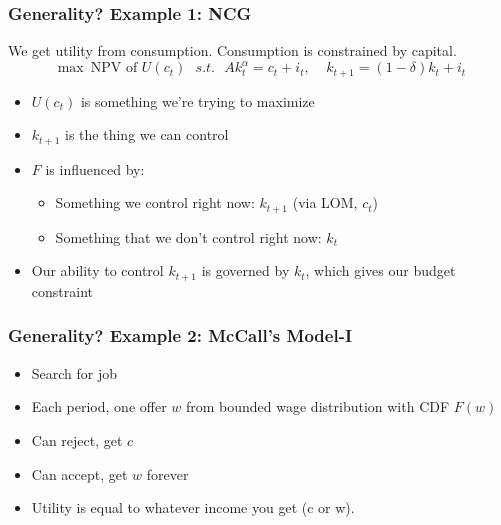 \documentclass{beamer}
\begin{document}
\begin{frame}
\frametitle[alignment=center]{Generality? Example 1: NCG}
We get utility from consumption.  Consumption is constrained by capital.
$$\max\  \text{NPV of \ }U(c_t)\ \ \ s.t. \ \ \  Ak_{t}^\alpha = c_t + i_t,\ \ \ \ \ k_{t+1}=(1-\delta)k_t+i_t$$
\begin{itemize}
\item $U(c_t)$ is something we're trying to maximize
\smallskip
\item $k_{t+1}$ is the thing we can control
\smallskip
\item $F$ is influenced by:
\smallskip
\begin{itemize}
\item  Something we control right now: $k_{t+1}$ (via LOM, $c_t$)  
\smallskip
\item Something that we don't control right now: $k_t$ 
\end{itemize}
\smallskip
\item Our ability to control $k_{t+1}$ is governed by $k_t$, which gives our budget constraint
\end{itemize}
\end{frame}

\begin{frame}
\frametitle[alignment=center]{Generality? Example 2: McCall's Model-I}
\begin{itemize}
\item Search for job
\bigskip
\item Each period, one offer $w$ from bounded wage distribution with CDF $F(w)$
\bigskip
\item Can reject, get $c$
\bigskip
\item Can accept, get $w$ forever
\bigskip
\item Utility is equal to whatever income you get (c or w).
\end{itemize}
\end{frame}
\end{document}
